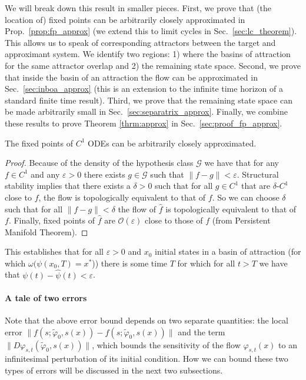 \documentclass{article}
\newcounter{ct}
\begin{document}
We will break down this result in smaller pieces. 
First, we prove that (the location of) fixed points can be arbitrarily closely approximated in Prop.~\ref{prop:fp_approx} (we extend this to limit cycles in Sec.~\ref{sec:lc_theorem}).
This allows us to speak of corresponding attractors between the target and approximant system.
We identify two regions: 1) where the basins of attraction for the same attractor overlap and 2) the remaining state space.
Second, we prove that inside the basin of an attraction the flow can be approximated in Sec.~\ref{sec:inboa_approx} (this is an extension to the infinite time horizon of a standard finite time result). %
Third, we prove that the remaining state space can be made arbitrarily small in Sec.~\ref{sec:separatrix_approx}.
Finally, we combine these results to prove Theorem \ref{thrm:approx} in Sec.~\ref{sec:proof_fp_approx}.

\begin{proposition}\label{prop:fp_approx}
The fixed points of $C^1$ ODEs can be arbitrarily closely approximated. %
\end{proposition}

\begin{proof}
Because of the density of the hypothesis class $\mathcal{G}$ we have that for any $f\in C^1$ and any $\varepsilon>0$
there exists $g\in\mathcal{G}$ such that $\|f-g\|<\varepsilon$.
%
Structural stability implies that there exists a $\delta>0$ such that for all $g\in C^1$ that are $\delta$-$C^1$ close to $f$, the flow is topologically equivalent to that of $f$.
So we can choose $\delta$ such that for all $\|f-g\|<\delta$ the flow of $\hat f$ is topologically equivalent to that of $f$.
Finally, fixed points of $\hat f$ are $\mathcal{O}(\varepsilon)$ close to those of $f$ (from Persistent Manifold Theorem\cite{jones1995gspt}).
\end{proof}

This establishes that for all $\varepsilon>0$ and $x_0$ initial states in a basin of attraction (for which $\omega (\psi(x_0,T) = x^*$)) there is some time $T$ for which for all $t>T$ we have that $\psi(t)-\hat \psi(t)<\varepsilon$.


\paragraph{A tale of two errors}
Note that the above error bound depends on two separate quantities: the local error 
$\| f(s; \tilde{\varphi}_0, s(x)) - f(s; \tilde{\varphi}_0, s(x)) \|$ 
 and the term 
$\| D\varphi_{s,t}(\tilde{\varphi}_0, s(x)) \|$, 
which bounds the sensitivity of the flow $\varphi_{s,t}(x)$ to an infinitesimal perturbation of its initial condition.
How we can bound these two types of errors will be discussed in the next two subsections.%
\end{document}

